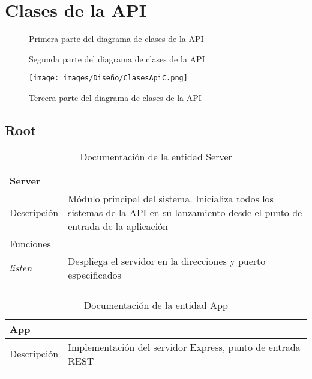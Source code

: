 \section{Clases de la API}

\begin{figure}[H]
    \centering
    \caption{Primera parte del diagrama de clases de la API}
    \label{fig:diagrama_clases_api_a}
\end{figure}

\begin{figure}[H]
    \centering
    \caption{Segunda parte del diagrama de clases de la API}
    \label{fig:diagrama_clases_api_b}
\end{figure}

\begin{figure}[H]
    \centering
    \texttt{[image: images/Diseño/ClasesApiC.png]}
    \caption{Tercera parte del diagrama de clases de la API}
    \label{fig:diagrama_clases_api_c}
\end{figure}

\subsection{Root}

\begin{longtable}{|p{} p{}|}
    \hline
    \multicolumn{2}{|l|}{\textbf{Server}} \\ \hline \hline
    Descripción      & Módulo principal del sistema. Inicializa todos los sistemas de la API en su lanzamiento desde el punto de entrada de la aplicación \\ \hline
    \multicolumn{2}{|l|}{Funciones} \\
    \emph{listen}  & Despliega el servidor en la direcciones y puerto especificados  \\ \hline
    \caption{Documentación de la entidad Server}
    \label{dis:api:server}
\end{longtable}

\begin{longtable}{|p{} p{}|}
    \hline
    \multicolumn{2}{|l|}{\textbf{App}} \\ \hline \hline
    Descripción      & Implementación del servidor Express, punto de entrada REST \\ \hline
    \caption{Documentación de la entidad App}
    \label{dis:api:app}
\end{longtable}

